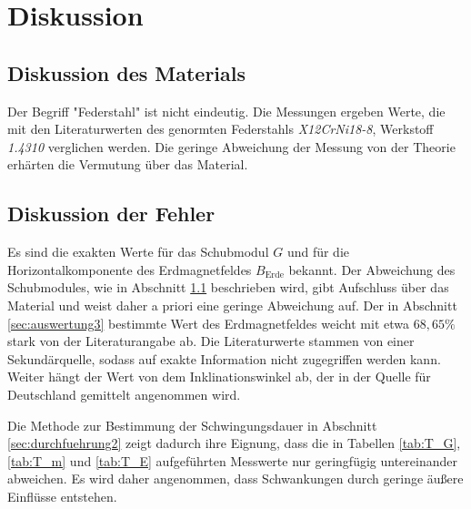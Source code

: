\section{Diskussion}
\label{sec:Diskussion}
\subsection{Diskussion des Materials}
\label{sec:dis1}
Der Begriff "Federstahl" ist nicht eindeutig.
Die Messungen ergeben Werte, die mit den Literaturwerten des genormten Federstahls \textit{X12CrNi18-8}, Werkstoff \textit{1.4310} \cite{federstahl} verglichen werden.
Die geringe Abweichung der Messung von der Theorie erhärten die Vermutung über das Material.
\subsection{Diskussion der Fehler}
Es sind die exakten Werte für das Schubmodul $G$ und für die Horizontalkomponente des Erdmagnetfeldes $B_\text{Erde}$ bekannt.
Der Abweichung des Schubmodules, wie in Abschnitt \ref{sec:dis1} beschrieben wird, gibt Aufschluss über das Material und weist daher a priori eine geringe Abweichung auf.
Der in Abschnitt \ref{sec:auswertung3} bestimmte Wert des Erdmagnetfeldes weicht mit etwa $68,65\%$ stark von der Literaturangabe ab.
Die Literaturwerte stammen von einer Sekundärquelle, sodass auf exakte Information nicht zugegriffen werden kann.
Weiter hängt der Wert von dem Inklinationswinkel ab, der in der Quelle für Deutschland gemittelt angenommen wird.

Die Methode zur Bestimmung der Schwingungsdauer in Abschnitt \ref{sec:durchfuehrung2} zeigt dadurch ihre Eignung, dass die in Tabellen \ref{tab:T_G}, \ref{tab:T_m} und \ref{tab:T_E} aufgeführten Messwerte nur geringfügig untereinander abweichen.
Es wird daher angenommen, dass Schwankungen durch geringe äußere Einflüsse entstehen.
